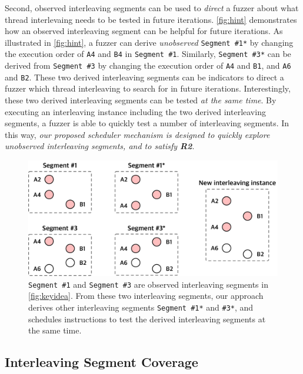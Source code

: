 Second, observed interleaving segments can be used to \textit{direct}
a fuzzer about what thread interlevaing needs to be tested in future
iterations.
%
\autoref{fig:hint} demonstrates how an observed interleaving segment
can be helpful for future iterations.
%
As illustrated in \autoref{fig:hint}, a fuzzer can derive
\textit{unobserved} \texttt{Segment \#1*} by changing the execution
order of \texttt{A4} and \texttt{B4} in \texttt{Segment \#1}.
%
Similarly, \texttt{Segment \#3*} can be derived from \texttt{Segment
  \#3} by changing the execution order of \texttt{A4} and \texttt{B1},
and \texttt{A6} and \texttt{B2}.
%
These two derived interleaving segments can be indicators to direct a
fuzzer which thread interleaving to search for in future
iterations.
%
Interestingly, these two derived interleaving segments can be tested
\textit{at the same time}. By executing an interleaving instance
including the two derived interleaving segments, a fuzzer is able to
quickly test a number of interleaving segments.
%
In this way, \textit{our proposed scheduler mechanism is designed to
  quickly explore unobserved interleaving segments, and to satisfy
  \textbf{R2}}.
%
\begin{figure}[t]
  \centering
  \includegraphics[width=0.9\linewidth]{fig/hint.pdf}
  \caption{\texttt{Segment \#1} and \texttt{Segment \#3} are observed
    interleaving segments in \autoref{fig:keyidea}.
    From these two interleaving segments, our approach derives other
    interleaving segments \texttt{Segment \#1*} and \texttt{\#3*}, and
    schedules instructions to test the derived interleaving segments
    at the same time.}
  \label{fig:hint}
\end{figure}
%



\subsection{Interleaving Segment Coverage}
\label{ss:coverage}

